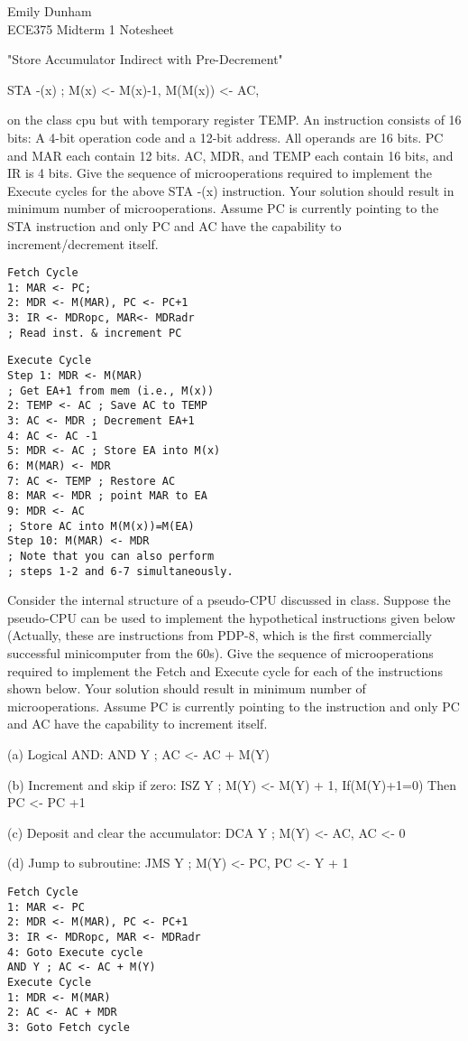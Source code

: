 \documentclass[8pt]{article}
\begin{document}
\begin{multicols}{3}
Emily Dunham\\
ECE375 Midterm 1 Notesheet

"Store Accumulator Indirect with Pre-Decrement"

STA -(x) ; M(x) <- M(x)-1, M(M(x)) <- AC,

on the class cpu but with temporary register TEMP. An instruction consists of
16 bits: A 4-bit operation code and a 12-bit address. All operands are 16
bits. PC and MAR each contain 12 bits. AC, MDR, and TEMP each contain 16 bits,
and IR is 4 bits. Give the sequence of microoperations required to implement
the Execute cycles for the above STA -(x) instruction. Your solution should
result in minimum number of microoperations. Assume PC is currently pointing 
to the STA instruction and only PC and AC have the capability to 
increment/decrement itself. 

\begin{verbatim}
Fetch Cycle
1: MAR <- PC;
2: MDR <- M(MAR), PC <- PC+1
3: IR <- MDRopc, MAR<- MDRadr 
; Read inst. & increment PC
\end{verbatim}

\begin{verbatim}
Execute Cycle
Step 1: MDR <- M(MAR) 
; Get EA+1 from mem (i.e., M(x))
2: TEMP <- AC ; Save AC to TEMP
3: AC <- MDR ; Decrement EA+1
4: AC <- AC -1
5: MDR <- AC ; Store EA into M(x)
6: M(MAR) <- MDR
7: AC <- TEMP ; Restore AC
8: MAR <- MDR ; point MAR to EA
9: MDR <- AC 
; Store AC into M(M(x))=M(EA)
Step 10: M(MAR) <- MDR
; Note that you can also perform 
; steps 1-2 and 6-7 simultaneously.
\end{verbatim}


Consider the internal structure of a pseudo-CPU discussed in class. Suppose
the pseudo-CPU can be used to implement the hypothetical instructions given
below (Actually, these are instructions from PDP-8, which is the first
commercially successful minicomputer from the 60s). Give the sequence of
microoperations required to implement the Fetch and Execute cycle for each of
the instructions shown below. Your solution should result in minimum number of
microoperations. Assume PC is currently pointing to the instruction and only
PC and AC have the capability to increment itself.

(a) Logical AND: AND Y ; AC <- AC + M(Y)

(b) Increment and skip if zero: 
ISZ Y ; M(Y) <- M(Y) + 1, If(M(Y)+1=0) Then PC <- PC +1

(c) Deposit and clear the accumulator: DCA
Y ; M(Y) <- AC, AC <- 0

(d) Jump to subroutine: JMS Y ; M(Y) <- PC, PC <- Y + 1

\begin{verbatim}
Fetch Cycle
1: MAR <- PC
2: MDR <- M(MAR), PC <- PC+1
3: IR <- MDRopc, MAR <- MDRadr
4: Goto Execute cycle
AND Y ; AC <- AC + M(Y)
Execute Cycle
1: MDR <- M(MAR)
2: AC <- AC + MDR
3: Goto Fetch cycle
\end{verbatim}



\end{multicols}
\end{document}
